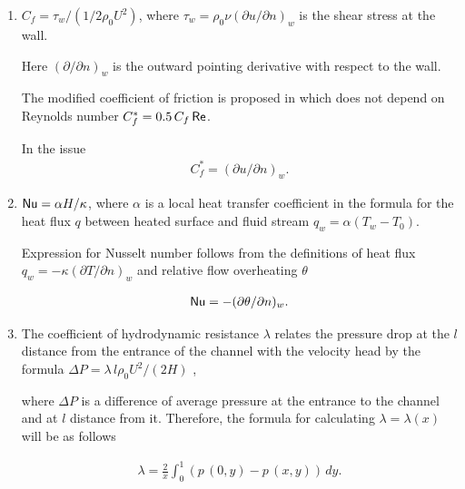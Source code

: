 \begin{enumerate}



\item[1.]  

$C_f = \tau_w/(1/2\rho_0U^2)$, where $\tau_w = \rho_0\nu(\partial u /\partial n)_w$ is the shear stress at the wall. 

Here $(\partial / \partial n)_w$ is the outward pointing derivative with respect to the wall. 

The modified coefficient of friction is proposed in \cite{AbuNada} which does not depend on Reynolds number  \mbox{$C_f^*=0.5\,C_f \mathop{\sf Re}$}.  

In the issue \begin{gather*} 

C_f^* = (\partial u/\partial n)_w.

\end{gather*}



\item[2.]   ${\sf Nu} = \alpha H /\kappa$, where $\alpha$ is a local heat transfer coefficient in the formula for the heat flux $q$ between heated surface and fluid stream $q_w = \alpha (T_w - T_0)$. 

Expression for Nusselt number follows from the definitions of heat flux $q_w = -\kappa(\partial T/\partial n)_w$ and relative flow overheating $\theta$ \cite{TrhBat2006}

\begin{gather*} 

{\sf Nu} = - (\partial \theta/\partial n)_w.

\end{gather*}



\item[3.]   

 The coefficient of hydrodynamic resistance $\lambda$ relates the pressure drop at the $l$ distance from the entrance of the channel with the velocity head by the formula $\Delta P = \lambda \,l \rho_0 U^2 / (2H)$ \cite{Loits}, 

 where $\Delta P$ is a difference of average pressure at the entrance to the channel and at $l$ distance from it. Therefore, the formula for calculating $\lambda=\lambda(x)$ will be as follows

\begin{gather*} 

\lambda = \frac{2}{x}\int_{0}^1 (p\,(0,y)-p\,(x,y))\, dy.

\end{gather*}





\end{enumerate}



